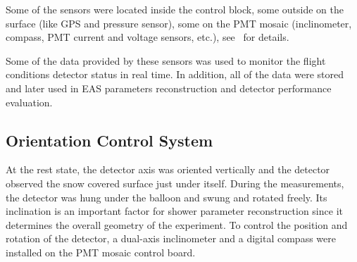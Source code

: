 \documentclass[universe,article,accept,moreauthors,pdftex]{Definitions/mdpi}
\begin{document}

Some of the sensors were located inside the control block, some outside on the surface (like GPS and pressure sensor), some on the PMT mosaic (inclinometer, compass, PMT current and voltage sensors, etc.), see~\cite{Ant20} for details.

Some of the data provided by these sensors was used to monitor the flight conditions detector status in real time. In addition,  all of the data were stored and later used in EAS parameters reconstruction and detector performance evaluation.


\subsection{Orientation Control System}
\label{sect:orientation}

At the rest state, the detector axis was oriented vertically and the detector observed the snow covered surface just under itself. During the measurements, the detector was hung under the balloon and swung and rotated freely. Its inclination is an important factor for shower parameter reconstruction since it determines the overall geometry of the experiment. To control the position and rotation of the detector, a dual-axis inclinometer and a digital compass were installed on the PMT mosaic control board. 
\end{document}
